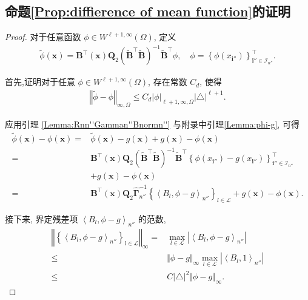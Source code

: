 \documentclass[a4paper,openay,14pt]{ctexbook}
\numberwithin{equation}{section}
\numberwithin{lem}{section}
\begin{document}
\subsection{命题\ref{Prop:diffierence of mean function}的证明}
\begin{proof}
    对于任意函数 $\phi \in W^{\ell+1,\infty}(\Omega)$, 定义  
\begin{align*}
\tilde{\phi}(\boldsymbol{x}) 
= \mathbf{B}^{\top}(\boldsymbol{x})
\mathbf{Q}_2
\left(\tilde{\mathbf{B}}^{\top}\tilde{\mathbf{B}}\right)^{-1}
\tilde{\mathbf{B}}^{\top}\phi, 
\quad 
\phi = \left\{\phi(x_{\mathbf{i}''})\right\}^{\top}_{\mathbf{i}''\in\mathcal{I}_{n''}}.
\end{align*}

首先,证明对于任意 $\phi\in W^{\ell+1,\infty}(\Omega)$, 存在常数 $C_d$, 使得
\begin{align}\label{inequ:tildephi}
\left\Vert \tilde\phi - \phi\right\Vert_{\infty,\Omega} 
\leq 
C_d 
\vert\phi\vert_{\ell+1,\infty,\Omega}
\vert \triangle\vert^{\ell+1}.  
\end{align}

应用引理 \ref{Lemma:Rnn''Gamman''Bnormn''} 与附录中引理\ref{Lemma:phi-g}, 可得
\begin{align*}
\tilde{\phi}(\boldsymbol{x}) - \phi(\boldsymbol{x}) 
=& \tilde{\phi}(\boldsymbol{x}) - g(\boldsymbol{x}) 
+ g(\boldsymbol{x})-\phi(\boldsymbol{x})\\
=&
\mathbf{B}^{\top}(\boldsymbol{x})
\mathbf{Q}_2
\left(\tilde{\mathbf{B}}^{\top}\tilde{\mathbf{B}}\right)^{-1}
\tilde{\mathbf{B}}^{\top}
\left\{\phi(x_{\mathbf{i}''}) - g(x_{\mathbf{i}''})\right\}^{\top}_{\mathbf{i}''\in\mathcal{I}_{n''}} 
\\
&+ g(\boldsymbol{x}) - \phi(\boldsymbol{x})\\
=&
\mathbf{B}^{\top}(\boldsymbol{x})
\mathbf{Q}_2
\hat{\boldsymbol{\Gamma}}^{-1}_{n''}
\left\{\left\langle B_l,\phi-g\right\rangle_{n''}\right\}_{l\in\mathcal{L}} 
+ g(\boldsymbol{x}) - \phi(\boldsymbol{x}).
\end{align*}

接下来, 界定残差项 $\left\langle B_l, \phi - g \right\rangle_{n''}$ 的范数,
\begin{align*}
    \left\Vert\left\{\left\langle B_l,\phi-g\right\rangle_{n''}\right\}_{l\in\mathcal{L}}\right\Vert_{\infty} = &\max_{l\in\mathcal{L}}\left\vert\left< B_l,\phi-g\right>_{n''}\right\vert\\
    \leq & \Vert \phi-g\Vert_{\infty}\max_{l\in\mathcal{L}}\left\vert\left<B_l,1\right>_{n''}\right\vert\\
    \leq & C\vert\triangle\vert^2\Vert \phi-g\Vert_{\infty}.
\end{align*}


\end{proof}
\end{document}
